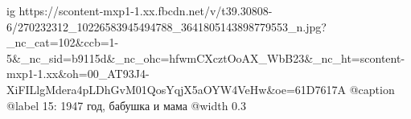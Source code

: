  
 
 
 
 

\ifcmt
  ig https://scontent-mxp1-1.xx.fbcdn.net/v/t39.30808-6/270232312_10226583945494788_3641805143898779553_n.jpg?_nc_cat=102&ccb=1-5&_nc_sid=b9115d&_nc_ohc=hfwmCXcztOoAX_WbB23&_nc_ht=scontent-mxp1-1.xx&oh=00_AT93J4-XiFILlgMdera4pLDhGvM01QosYqjX5aOYW4VeHw&oe=61D7617A
	@caption @label 15: 1947 год, бабушка и мама
  @width 0.3
\fi
